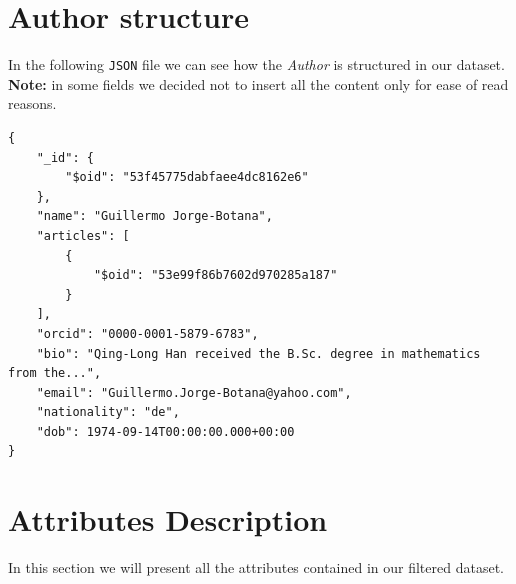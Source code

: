 \documentclass{Configuration_Files/PoliMi3i_thesis}
\begin{document}
\section{Author structure}
In the following \verb |JSON| file we can see how the \emph{Author} is structured in our dataset.\newline
\textbf{Note:} in some fields we decided not to insert all the content only for ease of read reasons.
\begin{lstlisting}
{
	"_id": {
		"$oid": "53f45775dabfaee4dc8162e6"
	},
	"name": "Guillermo Jorge-Botana",
	"articles": [
		{
			"$oid": "53e99f86b7602d970285a187"
		}
	],
	"orcid": "0000-0001-5879-6783",
	"bio": "Qing-Long Han received the B.Sc. degree in mathematics from the...",
	"email": "Guillermo.Jorge-Botana@yahoo.com",
	"nationality": "de",
	"dob": 1974-09-14T00:00:00.000+00:00
}
\end{lstlisting}

\newpage
\section{Attributes Description}
In this section we will present all the attributes contained in our filtered dataset.
\end{document}
